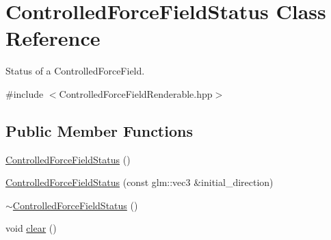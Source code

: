\hypertarget{classControlledForceFieldStatus}{\section{Controlled\+Force\+Field\+Status Class Reference}
\label{classControlledForceFieldStatus}
}


Status of a Controlled\+Force\+Field.  




{\ttfamily \#include $<$Controlled\+Force\+Field\+Renderable.\+hpp$>$}

\subsection*{Public Member Functions}
\begin{DoxyCompactItemize}
\item 
\hyperlink{classControlledForceFieldStatus_a67a89815a34681965fe5504fb48cae3f}{Controlled\+Force\+Field\+Status} ()
\item 
\hyperlink{classControlledForceFieldStatus_aa7daabfb1a302e8b7c16ef8021dc5990}{Controlled\+Force\+Field\+Status} (const glm\+::vec3 \&initial\+\_\+direction)
\item 
\hyperlink{classControlledForceFieldStatus_a73042e26b762984a429d66c46e76a1a2}{$\sim$\+Controlled\+Force\+Field\+Status} ()
\item 
void \hyperlink{classControlledForceFieldStatus_aaf77c94767cdcc4d7a1dffc8e29aae0d}{clear} ()
\end{DoxyCompactItemize}
